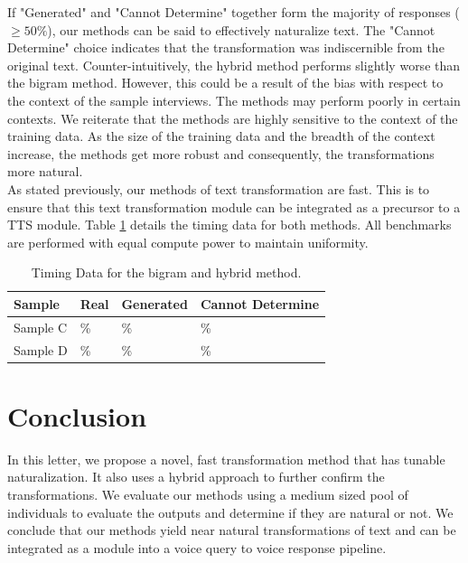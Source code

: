 \documentclass[journal]{IEEEtran}
\begin{document}
If "Generated" and "Cannot Determine" together form the majority of responses ($\geq 50\%$), our methods can be said to effectively naturalize text. The "Cannot Determine" choice indicates that the transformation was indiscernible from the original text. Counter-intuitively, the hybrid method performs slightly worse than the bigram method. However, this could be a result of the bias with respect to the context of the sample interviews. The methods may perform poorly in certain contexts. We reiterate that the methods are highly sensitive to the context of the training data. As the size of the training data and the breadth of the context increase, the methods get more robust and consequently, the transformations more natural. \\

As stated previously, our methods of text transformation are fast. This is to ensure that this text transformation module can be integrated as a precursor to a TTS module. Table \ref{tab5} details the timing data for both methods. All benchmarks are performed with equal compute power to maintain uniformity. 


\begin{table}
\caption{Timing Data for the bigram and hybrid method.}
\label{tab5}
\small
\setlength{\tabcolsep}{3pt}
\begin{tabular}{|p{58pt}|p{58pt}|p{58pt}|p{58pt}|}
\hline
Sample& 
Real& 
Generated&
Cannot Determine \\
\hline
Sample C & \% & \% & \% \\
Sample D & \% & \% & \% \\
\hline
\end{tabular}
\label{tab5}
\end{table}

\section{Conclusion}

In this letter, we propose a novel, fast transformation method that has tunable naturalization. It also uses a hybrid approach to further confirm the transformations. We evaluate our methods using a medium sized pool of individuals to evaluate the outputs and determine if they are natural or not. We conclude that our methods yield near natural transformations of text and can be integrated as a module into a voice query to voice response pipeline.
\end{document}
